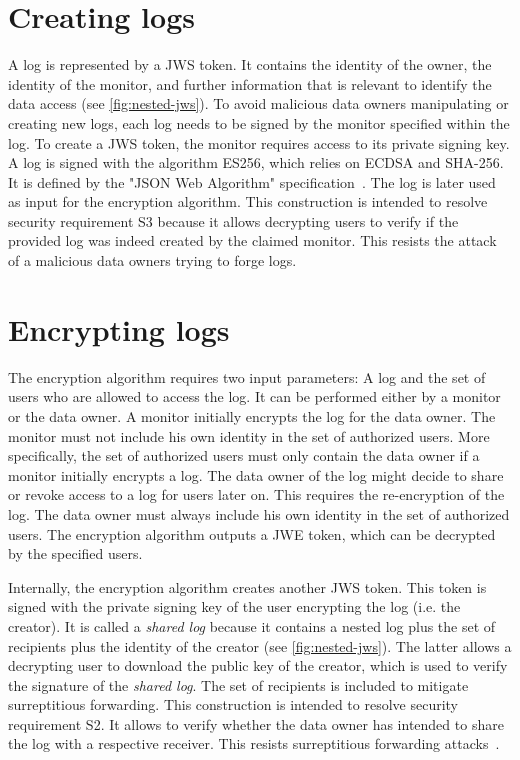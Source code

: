 \documentclass[../main.tex]{subfiles}
\begin{document}
\begin{itemize}
\section{Creating logs}
\label{sec:signing}
A log is represented by a JWS token.
It contains the identity of the owner, the identity of the monitor, and further information that is relevant to identify the data access (see \cref{fig:nested-jws}).
To avoid malicious data owners manipulating or creating new logs, each log needs to be signed by the monitor specified within the log.
To create a JWS token, the monitor requires access to its private signing key.
A log is signed with the algorithm ES256, which relies on ECDSA and SHA-256.
It is defined by the "JSON Web Algorithm" specification~\cite{JWA2015}.
The log is later used as input for the encryption algorithm.
This construction is intended to resolve security requirement S3 because it allows decrypting users to verify if the provided log was indeed created by the claimed monitor.
This resists the attack of a malicious data owners trying to forge logs.

\section{Encrypting logs}\label{sec:encrypting}

The encryption algorithm requires two input parameters: A log and the set of users who are allowed to access the log.
It can be performed either by a monitor or the data owner.
A monitor initially encrypts the log for the data owner.
The monitor must not include his own identity in the set of authorized users.
More specifically, the set of authorized users must only contain the data owner if a monitor initially encrypts a log.
The data owner of the log might decide to share or revoke access to a log for users later on.
This requires the re-encryption of the log.
The data owner must always include his own identity in the set of authorized users.
The encryption algorithm outputs a JWE token, which can be decrypted by the specified users.

Internally, the encryption algorithm creates another JWS token.
This token is signed with the private signing key of the user encrypting the log (i.e. the creator).
It is called a \emph{shared log} because it contains a nested log plus the set of recipients plus the identity of the creator (see \cref{fig:nested-jws}).
The latter allows a decrypting user to download the public key of the creator, which is used to verify the signature of the \emph{shared log}.
The set of recipients is included to mitigate surreptitious forwarding.
This construction is intended to resolve security requirement S2.
It allows to verify whether the data owner has intended to share the log with a respective receiver.
This resists surreptitious forwarding attacks~\cite{Davis2001}.


\end{itemize}
\end{document}
